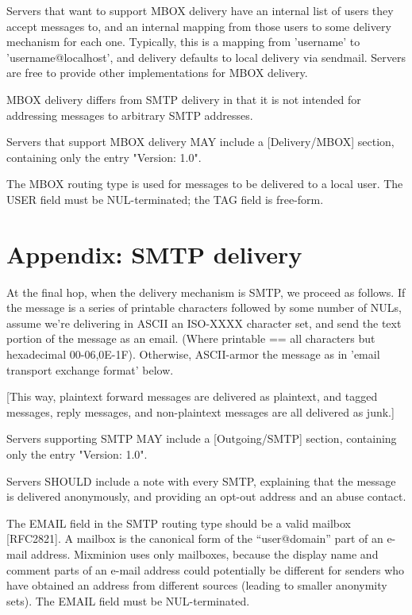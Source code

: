 Servers that want to support MBOX delivery have an internal list of
users they accept messages to, and an internal mapping from those
users to some delivery mechanism for each one.  Typically, this is a
mapping from 'username' to 'username@localhost', and delivery defaults
to local delivery via sendmail.  Servers are free to provide other
implementations for MBOX delivery.

MBOX delivery differs from SMTP delivery in that it is not intended
for addressing messages to arbitrary SMTP addresses.

Servers that support MBOX delivery MAY include a [Delivery/MBOX]
section, containing only the entry "Version: 1.0".

The MBOX routing type is used for messages to be delivered to a local
user.  The USER field must be NUL-terminated; the TAG field is
free-form. 

\section{Appendix: SMTP delivery}

At the final hop, when the delivery mechanism is SMTP, we proceed as
follows.  If the message is a series of printable characters followed
by some number of NULs, assume we're delivering in ASCII an ISO-XXXX
character set, and send the text portion of the message as an email.
(Where printable == {all characters but hexadecimal 00-06,0E-1F}).
Otherwise, ASCII-armor the message as in 'email transport exchange
format' below.

[This way, plaintext forward messages are delivered as plaintext,
and tagged messages, reply messages, and non-plaintext messages are
all delivered as junk.]

Servers supporting SMTP MAY include a [Outgoing/SMTP] section,
containing only the entry "Version: 1.0".

Servers SHOULD include a note with every SMTP, explaining that the
message is delivered anonymously, and providing an opt-out address and
an abuse contact.

The EMAIL field in the SMTP routing type should be a valid mailbox
[RFC2821]. A mailbox is the canonical form of the ``user@domain''
part of an e-mail address. Mixminion uses only mailboxes, because the
display name and comment parts of an e-mail address could potentially be
different for senders who have obtained an address from different
sources (leading to smaller anonymity sets). The EMAIL field must be
NUL-terminated.

